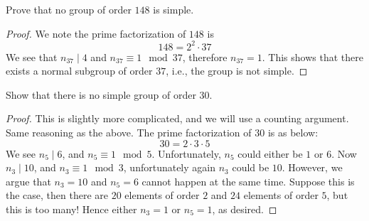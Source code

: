 \begin{prob}[F2007-Q1]
    Prove that no group of order $148$ is simple.
\end{prob}
\begin{proof}
    We note the prime factorization of $148$ is 
    \begin{equation*}
        148=2^2\cdot 37
    \end{equation*}
    We see that $n_{37}\mid 4$ and $n_{37}\equiv 1\mod 37$, therefore $n_{37}=1$. This shows that there exists a normal subgroup of order $37$, i.e., the group is not simple.
\end{proof}


\begin{prob}[F2017-Q1]
    Show that there is no simple group of order $30$.
\end{prob}
\begin{proof}
    This is slightly more complicated, and we will use a counting argument. 
    Same reasoning as the above. The prime factorization of $30$ is as below:
    \begin{equation*}
        30=2\cdot 3\cdot 5
    \end{equation*}
    We see $n_5\mid 6$, and $n_5\equiv 1\mod 5$. Unfortunately, $n_5$ could either be $1$ or $6$. Now $n_3\mid 10$, and $n_3\equiv 1\mod 3$, unfortunately again $n_3$ could be $10$. However, we argue that $n_3=10$ and $n_5=6$ cannot happen at the same time. Suppose this is the case, then there are $20$ elements of order $2$ and $24$ elements of order $5$, but this is too many! Hence either $n_3=1$ or $n_5=1$, as desired.
\end{proof}





